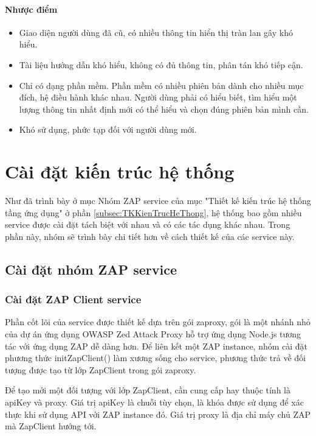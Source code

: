\paragraph{Nhược điểm}
\begin{itemize}
  \item Giao diện người dùng đã cũ, có nhiều thông tin hiển thị tràn lan gây khó hiểu.
  \item Tài liệu hướng dẫn khó hiểu, không có đủ thông tin, phân tán khó tiếp cận.
  \item Chỉ có dạng phần mềm. Phần mềm có nhiều phiên bản dành cho nhiều mục đích, hệ điều hành khác nhau. Người dùng phải có hiểu biết, tìm hiểu một lượng thông tin nhất định mới có thể hiểu và chọn đúng phiên bản mình cần.
  \item Khó sử dụng, phức tạp đối với người dùng mới.
\end{itemize}

\section{Cài đặt kiến trúc hệ thống} \label{sec:CaiDatKienTrucHeThong}

\tab Như đã trình bày ở mục Nhóm ZAP service của mục "Thiết kế kiến trúc hệ thống tầng ứng dụng" ở phần \ref{subsec:TKKienTrucHeThong}, hệ thống bao gồm nhiều service được cài đặt tách biệt với nhau và có các tác dụng khác nhau. Trong phần này, nhóm sẽ trình bày chi tiết hơn về cách thiết kế của các service này.

\subsection{Cài đặt nhóm ZAP service} \label{subsec:CaiDatNhomZapService}

\subsubsection{Cài đặt ZAP Client service}

\tab Phần cốt lõi của service được thiết kế dựa trên gói zaproxy, gói là một nhánh nhỏ của dự án ứng dụng OWASP Zed Attack Proxy hỗ trợ ứng dụng Node.js tương tác với ứng dụng ZAP dễ dàng hơn. Để liên kết một ZAP instance, nhóm cài đặt phương thức initZapClient() làm xương sống cho service, phương thức trả về đối tượng được tạo từ lớp ZapClient trong gói zaproxy.

Để tạo mới một đối tượng với lớp ZapClient, cần cung cấp hay thuộc tính là apiKey và proxy. Giá trị apiKey là chuỗi tùy chọn, là khóa được sử dụng để xác thực khi sử dụng API với ZAP instance đó. Giá trị proxy là địa chỉ máy chủ ZAP mà ZapClient hướng tới.


